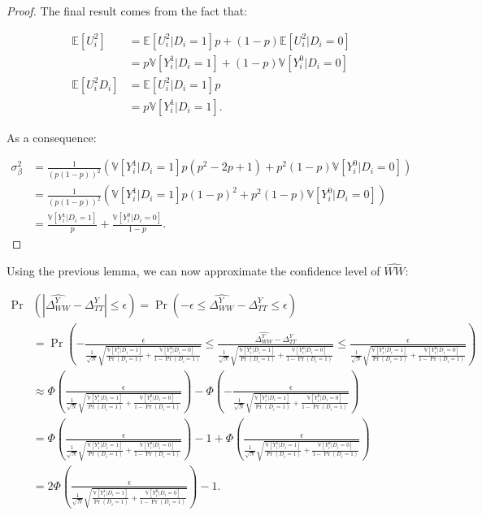 \documentclass[
]{book}
\newcommand{\esp}[1]{\mathbb{E}[ #1 ]}
\newcommand{\var}[1]{\mathbb{V}[ #1 ]}
\theoremstyle{definition}
\theoremstyle{definition}
\theoremstyle{definition}
\theoremstyle{definition}
\theoremstyle{remark}
\begin{document}
\begin{proof}
The final result comes from the fact that:

\begin{align*}
\esp{U_i^2} & = \esp{U_i^2|D_i=1}p + (1-p)\esp{U_i^2|D_i=0}\\
            & = p\var{Y_i^1|D_i=1}+(1-p)\var{Y_i^0|D_i=0} \\
\esp{U_i^2D_i}  & = \esp{U_i^2|D_i=1}p  \\
                & = p\var{Y_i^1|D_i=1}.
 \end{align*}

As a consequence:

\begin{align*}
\sigma^2_{\beta} &= \frac{1}{(p(1-p))^2}\left(\var{Y_i^1|D_i=1}p(p^2-2p+1) + p^2(1-p)\var{Y_i^0|D_i=0}\right) \\
                  &= \frac{1}{(p(1-p))^2}\left(\var{Y_i^1|D_i=1}p(1-p)^2 + p^2(1-p)\var{Y_i^0|D_i=0}\right)\\
                  & = \frac{\var{Y_i^1|D_i=1}}{p}+\frac{\var{Y_i^0|D_i=0}}{1-p}.
 \end{align*}
\end{proof}

Using the previous lemma, we can now approximate the confidence level of \(\hat{WW}\):

\begin{align*}
\Pr&(|\hat{\Delta^Y_{WW}}-\Delta^Y_{TT}|\leq\epsilon) = \Pr(-\epsilon\leq\hat{\Delta^Y_{WW}}-\Delta^Y_{TT}\leq\epsilon) \\
& = \Pr\left(-\frac{\epsilon}{\frac{1}{\sqrt{N}}\sqrt{\frac{\var{Y_i^1|D_i=1}}{\Pr(D_i=1)}+\frac{\var{Y_i^0|D_i=0}}{1-\Pr(D_i=1)}}}\leq\frac{\hat{\Delta^Y_{WW}}-\Delta^Y_{TT}}{\frac{1}{\sqrt{N}}\sqrt{\frac{\var{Y_i^1|D_i=1}}{\Pr(D_i=1)}+\frac{\var{Y_i^0|D_i=0}}{1-\Pr(D_i=1)}}}\leq\frac{\epsilon}{\frac{1}{\sqrt{N}}\sqrt{\frac{\var{Y_i^1|D_i=1}}{\Pr(D_i=1)}+\frac{\var{Y_i^0|D_i=0}}{1-\Pr(D_i=1)}}}\right)\\
& \approx \Phi\left(\frac{\epsilon}{\frac{1}{\sqrt{N}}\sqrt{\frac{\var{Y_i^1|D_i=1}}{\Pr(D_i=1)}+\frac{\var{Y_i^0|D_i=0}}{1-\Pr(D_i=1)}}}\right)-
\Phi\left(-\frac{\epsilon}{\frac{1}{\sqrt{N}}\sqrt{\frac{\var{Y_i^1|D_i=1}}{\Pr(D_i=1)}+\frac{\var{Y_i^0|D_i=0}}{1-\Pr(D_i=1)}}}\right)\\
& = \Phi\left(\frac{\epsilon}{\frac{1}{\sqrt{N}}\sqrt{\frac{\var{Y_i^1|D_i=1}}{\Pr(D_i=1)}+\frac{\var{Y_i^0|D_i=0}}{1-\Pr(D_i=1)}}}\right)- 1 + \Phi\left(\frac{\epsilon}{\frac{1}{\sqrt{N}}\sqrt{\frac{\var{Y_i^1|D_i=1}}{\Pr(D_i=1)}+\frac{\var{Y_i^0|D_i=0}}{1-\Pr(D_i=1)}}}\right)\\
& = 2\Phi\left(\frac{\epsilon}{\frac{1}{\sqrt{N}}\sqrt{\frac{\var{Y_i^1|D_i=1}}{\Pr(D_i=1)}+\frac{\var{Y_i^0|D_i=0}}{1-\Pr(D_i=1)}}}\right)-1.
\end{align*}
\end{document}

